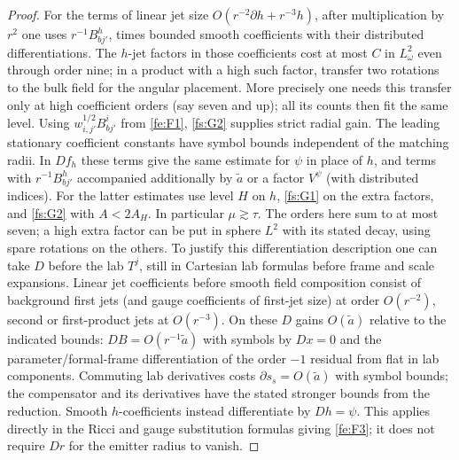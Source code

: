 \begin{proof}
For the terms of linear jet size \(O(r^{-2}\partial h+r^{-3}h)\), after multiplication by \(r^2\) one uses \(r^{-1} B^h_{b j'}\), times bounded smooth coefficients with their distributed differentiations. The \(h\)-jet factors in those coefficients cost at most \(C\) in \(L^2_\omega\) even through order nine; in a product with a high such factor, transfer two rotations to the bulk field for the angular placement. More precisely one needs this transfer only at high coefficient orders (say seven and up); all its counts then fit the same level. Using \(w_{i,j'}^{1/2} B^i_{b j'}\) from \eqref{fe:F1}, \eqref{fs:G2} supplies strict radial gain. The leading stationary coefficient constants have symbol bounds independent of the matching radii. In \(D f_h\) these terms give the same estimate for \(\psi\) in place of \(h\), and terms with \(r^{-1}B^h_{b j'}\) accompanied additionally by \(\widetilde a\) or a factor \(V^\psi\) (with distributed indices). For the latter estimates use level \(H\) on \(h\), \eqref{fs:G1} on the extra factors, and \eqref{fs:G2} with \(A<2A_H\). In particular \(\mu\gtrsim\tau\). The orders here sum to at most seven; a high extra factor can be put in sphere \(L^2\) with its stated decay, using spare rotations on the others. To justify this differentiation description one can take \(D\) before the lab \(T^j\), still in Cartesian lab formulas before frame and scale expansions. Linear jet coefficients before smooth field composition consist of background first jets (and gauge coefficients of first-jet size) at order \(O(r^{-2})\), second or first-product jets at \(O(r^{-3})\). On these \(D\) gains \(O(\widetilde a)\) relative to the indicated bounds: \(D B=O(r^{-1}\widetilde a)\) with symbols by \(D x=0\) and the parameter/formal-frame differentiation of the order \(-1\) residual from flat in lab components. Commuting lab derivatives costs \(\partial s_s=O(\widetilde a)\) with symbol bounds; the compensator and its derivatives have the stated stronger bounds from the reduction. Smooth \(h\)-coefficients instead differentiate by \(D h=\psi\). This applies directly in the Ricci and gauge substitution formulas giving \eqref{fe:F3}; it does not require \(D r\) for the emitter radius to vanish.


\end{proof}
